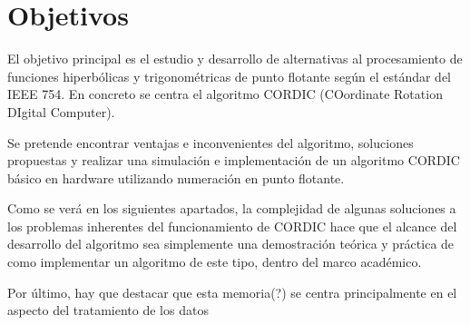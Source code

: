 
\chapter{Objetivos}
\label{objetivos}

El objetivo principal es el estudio y desarrollo de alternativas al procesamiento de funciones hiperbólicas y trigonométricas de punto flotante según el estándar del IEEE 754. En concreto se centra el algoritmo CORDIC (COordinate Rotation DIgital Computer).

Se pretende encontrar ventajas e inconvenientes del algoritmo, soluciones propuestas y realizar una simulación e implementación de un algoritmo CORDIC básico en hardware utilizando numeración en punto flotante.

Como se verá en los siguientes apartados, la complejidad de algunas soluciones a los problemas inherentes del funcionamiento de CORDIC hace que el alcance del desarrollo del algoritmo sea simplemente una demostración teórica y práctica de como implementar un algoritmo de este tipo, dentro del marco académico.

Por último, hay que destacar que esta memoria(?) se centra principalmente en el aspecto del tratamiento de los datos



